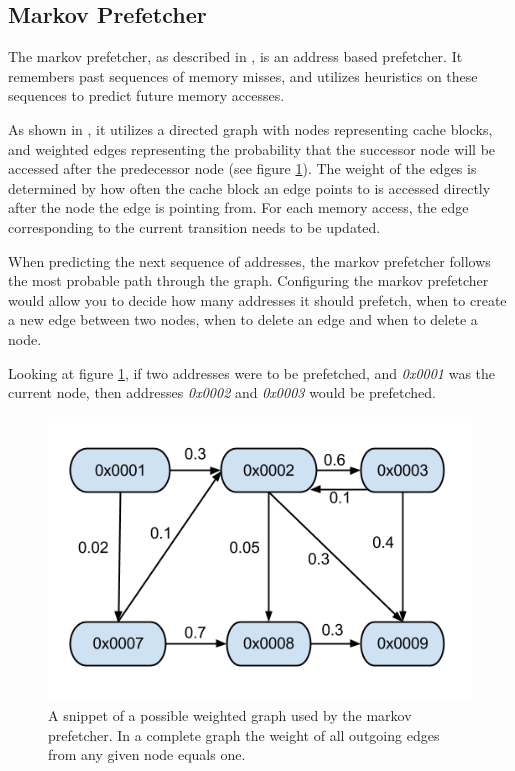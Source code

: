 \subsection{Markov Prefetcher}
\label{sec:markovPrefetcher}
The markov prefetcher, as described in \cite{Grannas}, is an address based prefetcher. It remembers past sequences of memory misses, and utilizes heuristics on these sequences to predict future memory accesses.

As shown in \cite{Joseph}, it utilizes a directed graph with nodes representing cache blocks, and weighted edges representing the probability that the successor node will be accessed after the predecessor node (see figure \ref{fig:markov}). The weight of the edges is determined by how often the cache block an edge points to is accessed directly after the node the edge is pointing from. For each memory access, the edge corresponding to the current transition needs to be updated. 

When predicting the next sequence of addresses, the markov prefetcher follows the most probable path through the graph. Configuring the markov prefetcher would allow you to decide how many addresses it should prefetch, when to create a new edge between two nodes, when to delete an edge and when to delete a node.

Looking at figure \ref{fig:markov}, if two addresses were to be prefetched, and \emph{0x0001} was the current node, then addresses \emph{0x0002} and \emph{0x0003} would be prefetched.

\begin{figure}[H]
\includegraphics[scale=0.5]{./figures/markov}
\caption{\label{fig:markov}A snippet of a possible weighted graph used by the markov prefetcher. In a complete graph the weight of all outgoing edges from any given node equals one.}
\end{figure}

